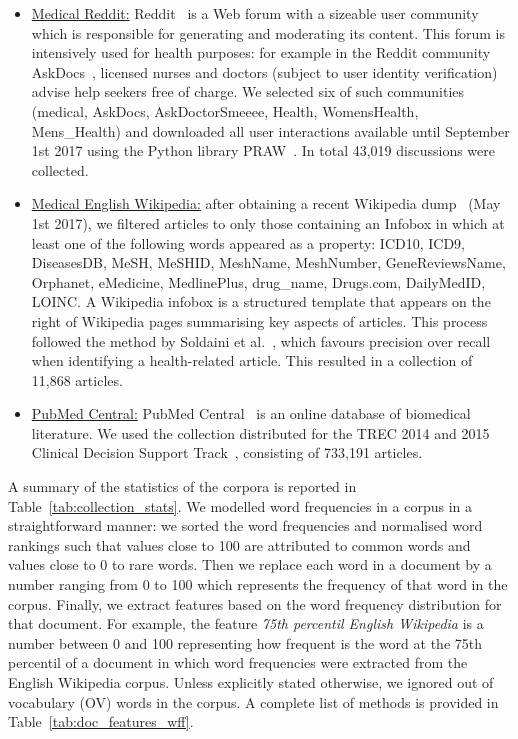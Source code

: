 \documentclass[10pt,a4paper]{article}
\begin{document}
\begin{itemize}[leftmargin=*]
	\item \underline{Medical Reddit:} Reddit~\cite{reddit} is a Web forum with a sizeable user community which is responsible for generating and moderating its content. This forum is intensively used for health purposes: for example in the Reddit community AskDocs~\cite{redditaskdocs}, licensed nurses and doctors (subject to user identity verification) advise help seekers free of charge. We selected six of such communities (medical, AskDocs, AskDoctorSmeeee, Health, WomensHealth, Mens\_Health) and downloaded all user interactions available until September 1st 2017 using the Python library PRAW~\cite{redditapi}. In total 43,019 discussions were collected.
	
	\item \underline{Medical English Wikipedia:} after obtaining a recent Wikipedia dump~\cite{wikipedia} (May 1st 2017), we filtered articles to only those containing an Infobox in which at least one of the following words appeared as a property: ICD10, ICD9, DiseasesDB, MeSH, MeSHID, MeshName, MeshNumber, GeneReviewsName, Orphanet, eMedicine, MedlinePlus, drug\_name, Drugs.com, DailyMedID, LOINC. A Wikipedia infobox is a structured template that appears on the right of Wikipedia pages summarising key aspects of articles. 
	This process followed the method by Soldaini et al.~\cite{soldaini15}, which favours precision over recall when identifying a health-related article. This resulted in a collection of 11,868 articles. 
	
	\item \underline{PubMed Central:} PubMed Central~\cite{pubmed} is an online  database of biomedical literature. We used the collection distributed for the TREC 2014 and 2015 Clinical Decision Support Track~\cite{roberts16,trec15}, consisting of 733,191 articles. 
	
\end{itemize}

A summary of the statistics of the corpora is reported in Table~\ref{tab:collection_stats}. 
We modelled word frequencies in a corpus in a straightforward manner: we sorted the word frequencies and normalised word rankings such that values close to 100 are attributed to common words and values close to 0 to rare words. Then we replace each word in a document by a number ranging from 0 to 100 which represents the frequency of that word in the corpus. 
Finally, we extract features based on the word frequency distribution for that document. 
For example, the feature \textit{75th percentil English Wikipedia} is a number between 0 and 100 representing how frequent is the word at the 75th percentil of a document in which word frequencies were extracted from the English Wikipedia corpus.
Unless explicitly stated otherwise, we ignored out of vocabulary (OV) words in the corpus. A complete list of methods is provided in Table~\ref{tab:doc_features_wff}.
\end{document}
